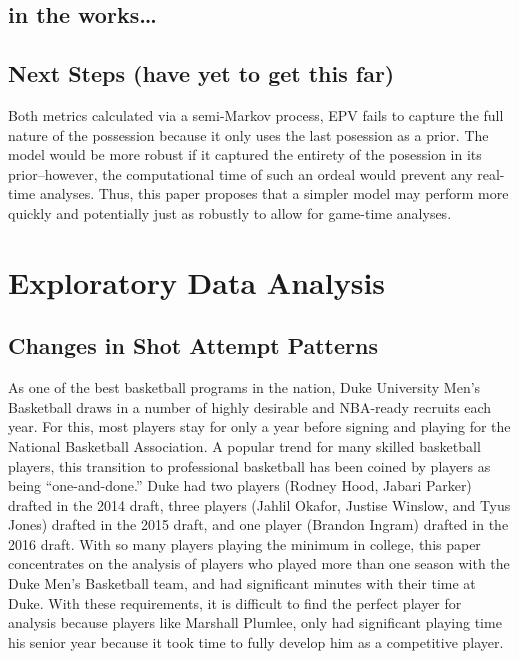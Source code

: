 \documentclass[12pt,twoside]{dukestatscithesis}
\theoremstyle{definition}
\theoremstyle{definition}
\theoremstyle{definition}
\theoremstyle{remark}
\begin{document}
\section{in the works\ldots{}}\label{in-the-works}

\section{Next Steps (have yet to get this
far)}\label{next-steps-have-yet-to-get-this-far}

Both metrics calculated via a semi-Markov process, EPV fails to capture
the full nature of the possession because it only uses the last
posession as a prior. The model would be more robust if it captured the
entirety of the posession in its prior--however, the computational time
of such an ordeal would prevent any real-time analyses. Thus, this paper
proposes that a simpler model may perform more quickly and potentially
just as robustly to allow for game-time analyses.

\chapter{Exploratory Data Analysis}\label{exploratory-data-analysis}

\section{Changes in Shot Attempt
Patterns}\label{changes-in-shot-attempt-patterns}

As one of the best basketball programs in the nation, Duke University
Men's Basketball draws in a number of highly desirable and NBA-ready
recruits each year. For this, most players stay for only a year before
signing and playing for the National Basketball Association. A popular
trend for many skilled basketball players, this transition to
professional basketball has been coined by players as being
``one-and-done.'' Duke had two players (Rodney Hood, Jabari Parker)
drafted in the 2014 draft, three players (Jahlil Okafor, Justise
Winslow, and Tyus Jones) drafted in the 2015 draft, and one player
(Brandon Ingram) drafted in the 2016 draft. With so many players playing
the minimum in college, this paper concentrates on the analysis of
players who played more than one season with the Duke Men's Basketball
team, and had significant minutes with their time at Duke. With these
requirements, it is difficult to find the perfect player for analysis
because players like Marshall Plumlee, only had significant playing time
his senior year because it took time to fully develop him as a
competitive player.
\end{document}
